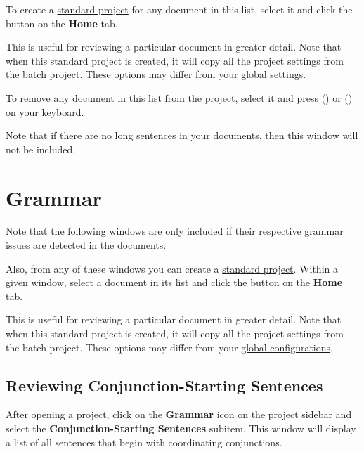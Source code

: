 \documentclass[
]{book}
\theoremstyle{definition}
\theoremstyle{definition}
\theoremstyle{definition}
\theoremstyle{definition}
\theoremstyle{remark}
\begin{document}
To create a \protect\hyperlink{creating-standard-project}{standard project} for any document in this list, select it and click the  button on the \textbf{Home} tab.

This is useful for reviewing a particular document in greater detail. Note that when this standard project is created, it will copy all the project settings from the batch project. These options may differ from your \protect\hyperlink{options-overview}{global settings}.

To remove any document in this list from the project, select it and press  (\faWindows) or \keys{\backdel} (\faApple) on your keyboard.

Note that if there are no long sentences in your documents, then this window will not be included.

\hypertarget{reviewing-batch-grammar}{%
\section{Grammar}\label{reviewing-batch-grammar}}

Note that the following windows are only included if their respective grammar issues are detected in the documents.

Also, from any of these windows you can create a \protect\hyperlink{creating-standard-project}{standard project}. Within a given window, select a document in its list and click the  button on the \textbf{Home} tab.

This is useful for reviewing a particular document in greater detail. Note that when this standard project is created, it will copy all the project settings from the batch project. These options may differ from your \protect\hyperlink{options-overview}{global configurations}.

\hypertarget{reviewing-batch-conjunction-sentences}{%
\subsection*{Reviewing Conjunction-Starting Sentences}\label{reviewing-batch-conjunction-sentences}}

After opening a project, click on the \textbf{Grammar} icon on the project sidebar and select the \textbf{Conjunction-Starting Sentences} subitem. This window will display a list of all sentences that begin with coordinating conjunctions.
\end{document}
